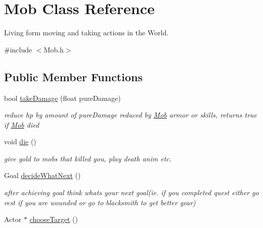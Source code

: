 \hypertarget{class_mob}{}\section{Mob Class Reference}
\label{class_mob}


Living form moving and taking actions in the World.  




{\ttfamily \#include $<$Mob.\+h$>$}

\subsection*{Public Member Functions}
\begin{DoxyCompactItemize}
\item 
bool \hyperlink{class_mob_af124fd088b64d10dde3eef2f5ec9f139}{take\+Damage} (float pure\+Damage)\hypertarget{class_mob_af124fd088b64d10dde3eef2f5ec9f139}{}\label{class_mob_af124fd088b64d10dde3eef2f5ec9f139}

\begin{DoxyCompactList}\small\item\em reduce hp by amount of pure\+Damage reduced by \hyperlink{class_mob}{Mob} armor or skills, returns true if \hyperlink{class_mob}{Mob} died \end{DoxyCompactList}\item 
void \hyperlink{class_mob_a07546ec7a5028846090157d51095904b}{die} ()\hypertarget{class_mob_a07546ec7a5028846090157d51095904b}{}\label{class_mob_a07546ec7a5028846090157d51095904b}

\begin{DoxyCompactList}\small\item\em give gold to mobs that killed you, play death anim etc. \end{DoxyCompactList}\item 
Goal \hyperlink{class_mob_ac949a1e6a9a60efd432adea5a4abdeb8}{decide\+What\+Next} ()\hypertarget{class_mob_ac949a1e6a9a60efd432adea5a4abdeb8}{}\label{class_mob_ac949a1e6a9a60efd432adea5a4abdeb8}

\begin{DoxyCompactList}\small\item\em after achieving goal think what\textquotesingle{}s your next goal(ie. if you completed quest either go rest if you are wounded or go to blacksmith to get better gear) \end{DoxyCompactList}\item 
Actor $\ast$ \hyperlink{class_mob_a80987418449007527dea30234099c301}{choose\+Target} ()\hypertarget{class_mob_a80987418449007527dea30234099c301}{}\label{class_mob_a80987418449007527dea30234099c301}


\end{DoxyCompactItemize}
